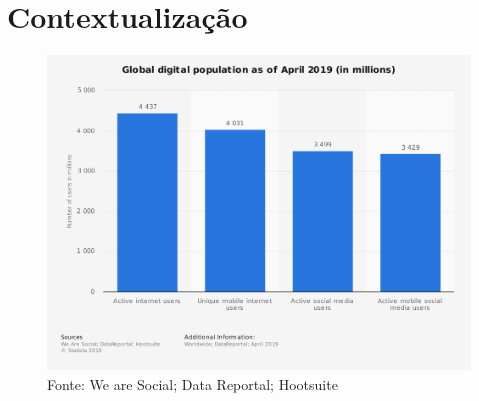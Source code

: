 

\section{Contextualização}
\begin{frame}{}
	\begin{figure}
		\includegraphics[width = 0.85\linewidth]{img/proj_tcc/statistic_id617136_worldwide-digital-population-as-of-april-2019.png}\\
		\tiny Fonte: We are Social; Data Reportal; Hootsuite
	\end{figure}
\end{frame}

